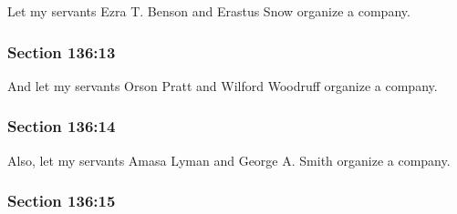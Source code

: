 		Let my servants Ezra T. Benson and Erastus Snow organize a company.


	\subsubsection{Section 136:13} %
		\label{DC136-13}

		And let my servants Orson Pratt and Wilford Woodruff organize a company.


	\subsubsection{Section 136:14} %
		\label{DC136-14}

		Also, let my servants Amasa Lyman and George A. Smith organize a company.


	\subsubsection{Section 136:15} %
		\label{DC136-15}

